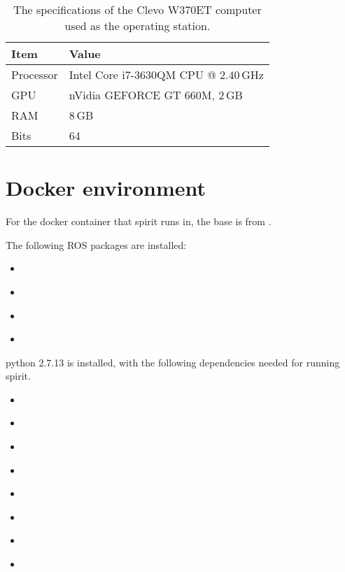   \begin{table}[h]
    \centering
    \caption[Operating station computer specifications]{The specifications of the Clevo W370ET computer used as the operating station.}
    \begin{tabular}{ll}
      \toprule
      Item & Value \\
      \midrule
      Processor & Intel Core i7-3630QM CPU @ 2.40\,GHz\\
      GPU & nVidia GEFORCE GT 660M, 2\,GB\\
      RAM & 8\,GB\\
      Bits & 64 \\
      \bottomrule
    \end{tabular}
    \label{tab:clevo_opstn}
  \end{table}

\section{Docker environment}
  For the \gls{docker} container that \gls{spirit} runs in, the base is from \texttt{}.

  The following ROS packages are installed:

  \begin{itemize}
    \item \textsf{}
    \item \textsf{}
    \item \textsf{}
    \item \textsf{}
  \end{itemize}

  \gls{python} 2.7.13 is installed, with the following dependencies needed for running \gls{spirit}.

  \begin{itemize}
    \item \textsf{}
    \item \textsf{}
    \item \textsf{}
    \item \textsf{}
    \item \textsf{}
    \item \textsf{}
    \item \textsf{}
    \item \textsf{}
  \end{itemize}


